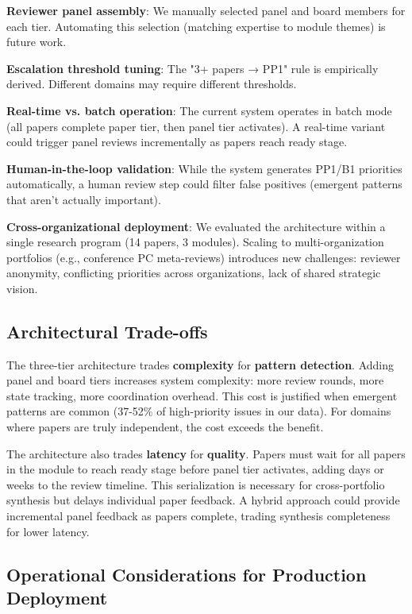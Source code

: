 \textbf{Reviewer panel assembly}: We manually selected panel and board members for each tier. Automating this selection (matching expertise to module themes) is future work.

\textbf{Escalation threshold tuning}: The "3+ papers → PP1" rule is empirically derived. Different domains may require different thresholds.

\textbf{Real-time vs. batch operation}: The current system operates in batch mode (all papers complete paper tier, then panel tier activates). A real-time variant could trigger panel reviews incrementally as papers reach ready stage.

\textbf{Human-in-the-loop validation}: While the system generates PP1/B1 priorities automatically, a human review step could filter false positives (emergent patterns that aren't actually important).

\textbf{Cross-organizational deployment}: We evaluated the architecture within a single research program (14 papers, 3 modules). Scaling to multi-organization portfolios (e.g., conference PC meta-reviews) introduces new challenges: reviewer anonymity, conflicting priorities across organizations, lack of shared strategic vision.

\subsection{Architectural Trade-offs}

The three-tier architecture trades \textbf{complexity} for \textbf{pattern detection}. Adding panel and board tiers increases system complexity: more review rounds, more state tracking, more coordination overhead. This cost is justified when emergent patterns are common (37-52\% of high-priority issues in our data). For domains where papers are truly independent, the cost exceeds the benefit.

The architecture also trades \textbf{latency} for \textbf{quality}. Papers must wait for all papers in the module to reach ready stage before panel tier activates, adding days or weeks to the review timeline. This serialization is necessary for cross-portfolio synthesis but delays individual paper feedback. A hybrid approach could provide incremental panel feedback as papers complete, trading synthesis completeness for lower latency.

\subsection{Operational Considerations for Production Deployment}
\label{sec:operational}

